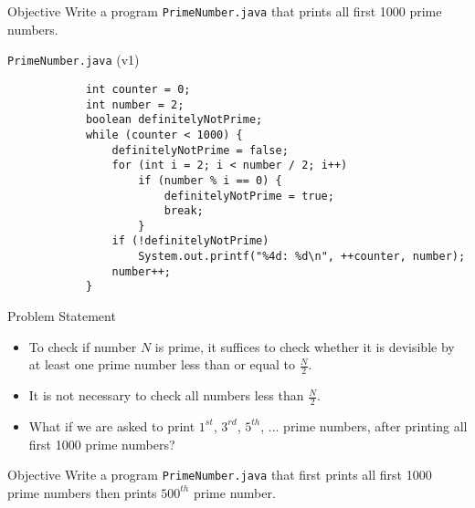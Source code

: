 \documentclass[10pt, compress]{beamer}
\begin{document}
\begin{slide}
	\begin{block}{Objective}
		Write a program \texttt{PrimeNumber.java} that prints all first 1000 prime numbers.
	\end{block}
\end{slide}

\begin{slide}
	\begin{block}{\texttt{PrimeNumber.java} (v1)}
		\begin{verbatim}
			int counter = 0;
			int number = 2;
			boolean definitelyNotPrime;
			while (counter < 1000) {
			    definitelyNotPrime = false;
			    for (int i = 2; i < number / 2; i++)
			        if (number % i == 0) {
			            definitelyNotPrime = true;
			            break;
			        }
			    if (!definitelyNotPrime)
			        System.out.printf("%4d: %d\n", ++counter, number);
			    number++;
			}
		\end{verbatim}
	\end{block}
\end{slide}

\begin{slide}
	\begin{block}{Problem Statement}
		\begin{itemize}
			\item[] To check if number $N$ is prime, it suffices to check whether it is devisible by at least one prime number less than or equal to $\frac{N}{2}$.
			\item[] It is not necessary to check all numbers less than $\frac{N}{2}$.
			\item[] What if we are asked to print $1^{st}$, $3^{rd}$, $5^{th}$, ... prime numbers, after printing all first 1000 prime numbers?
		\end{itemize}
	\end{block}
\end{slide}

\begin{slide}
	\begin{block}{Objective}
		Write a program \texttt{PrimeNumber.java} that first prints all first 1000 prime numbers then prints $500^{th}$ prime number.
	\end{block}
\end{slide}
\end{document}

